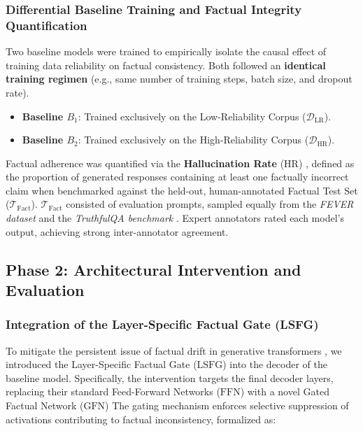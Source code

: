 \subsubsection{Differential Baseline Training and Factual Integrity Quantification}
\label{sec:baseline_training_quantification}
Two baseline models were trained to empirically isolate the causal effect of training data reliability on factual consistency. Both followed an \textbf{identical training regimen} (e.g., same number of training steps, batch size, and dropout rate).

\begin{itemize}
    \item \textbf{Baseline $B_1$}: Trained exclusively on the Low-Reliability Corpus ($\mathcal{D}_{\text{LR}}$).
    \item \textbf{Baseline $B_2$}: Trained exclusively on the High-Reliability Corpus ($\mathcal{D}_{\text{HR}}$).
\end{itemize}

Factual adherence was quantified via the \textbf{Hallucination Rate} ($\text{HR}$) \cite{islam2024comprehensive, cossio2025comprehensive}, defined as the proportion of generated responses containing at least one factually incorrect claim when benchmarked against the held-out, human-annotated Factual Test Set ($\mathcal{T}_{\text{Fact}}$). $\mathcal{T}_{\text{Fact}}$ consisted of evaluation prompts, sampled equally from the \textit{FEVER dataset} \cite{thorne2018fever} and the \textit{TruthfulQA benchmark} \cite{lin2021truthfulqa}. Expert annotators rated each model's output, achieving strong inter-annotator agreement.

\subsection{Phase 2: Architectural Intervention and Evaluation}
\label{sec:phase2_intervention}

\subsubsection{Integration of the Layer-Specific Factual Gate (LSFG)}
\label{sec:lsfg_integration}
To mitigate the persistent issue of factual drift in generative transformers \cite{islam2024comprehensive, cossio2025comprehensive}, we introduced the Layer-Specific Factual Gate ($\text{LSFG}$) into the decoder of the baseline model. Specifically, the intervention targets the final decoder layers, replacing their standard Feed-Forward Networks ($\text{FFN}$) \cite{vaswani2017attention} with a novel Gated Factual Network ($\text{GFN}$) The gating mechanism enforces selective suppression of activations contributing to factual inconsistency, formalized as:


